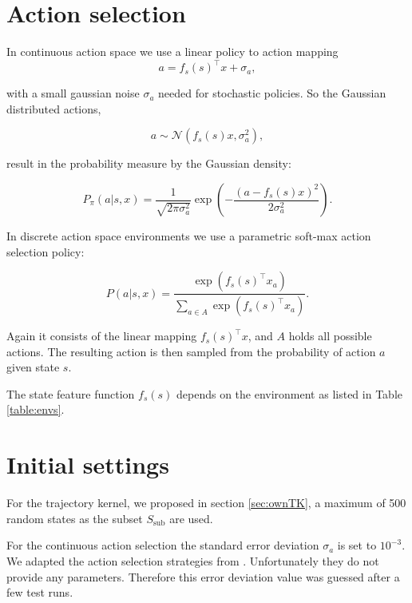 \section{Action selection}
\label{sec:actionselection}
In continuous action space we use a linear policy to action mapping
\begin{equation} \label{eq:actionselection}
    a = f_s(s)^\top x + \sigma_a,
\end{equation}

with a small gaussian noise $\sigma_a$ needed for stochastic policies. So the Gaussian distributed actions,

$$a \sim \mathcal{N}(f_s(s) x,\sigma_a^2),$$

result in the probability measure by the Gaussian density:

\begin{equation}\label{eq:contiAS}
    P_{\pi}(a|s,x) = \frac{1}{\sqrt{2\pi\sigma_a^2}}\exp\left(-\frac{(a-f_s(s)x)^2}{2\sigma_a^2}\right).
\end{equation}

In discrete action space environments we use a parametric soft-max action selection policy:

\begin{equation} \label{eq:discreteactionselection}
    P(a|s,x)= \frac{\exp(f_s(s)^\top x_a)}{\sum_{a\in A} \exp(f_s(s)^\top x_a)}.
\end{equation}

Again it consists of the linear mapping $f_s(s)^\top x$, and $A$ holds all possible actions. The resulting action is then sampled from the probability of action $a$ given state $s$.

The state feature function $f_s(s)$ depends on the environment as listed in Table \ref{table:envs}.

\section{Initial settings}

For the trajectory kernel, we proposed in section \ref{sec:ownTK}, a maximum of 500 random states as the subset $S_{\text{sub}}$ are used.

For the continuous action selection the standard error deviation $\sigma_a$ is set to $10^{-3}$. We adapted the action selection strategies from \cite{wilson2014using}. Unfortunately they do not provide any parameters. Therefore this error deviation value was guessed after a few test runs.

